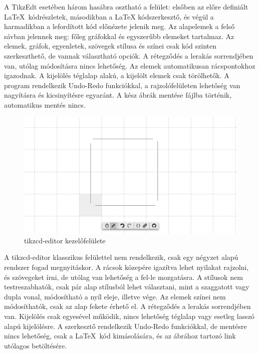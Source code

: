 \noindent
A TikzEdt esetében három hasábra osztható a felület: elsőben az előre definiált \LaTeX\ kódrészletek, másodikban a LaTeX kódszerkesztő, és végül a harmadikban a lefordított kód előnézete jelenik meg. Az alapelemek a felső sávban jelennek meg: főleg gráfokkal és egyszerűbb elemeket tartalmaz. Az elemek, gráfok, egyenletek, szövegek stílusa és színei csak kód szinten szerkeszthető, de vannak választható opciók. A rétegződés a lerakás sorrendjében van, utólag módosításra nincs lehetőség. Az elemek automatikusan rácspontokhoz igazodnak. A kijelölés téglalap alakú, a kijelölt elemek csak törölhetők.  A program rendelkezik Undo-Redo funkciókkal, a rajzolófelületen lehetőség van nagyításra és kicsinyítésre egyaránt. A kész ábrák mentése fájlba történik, automatikus mentés nincs.

\begin{figure}[!h]
	\includegraphics[width=\textwidth]{images/tikzcd.png}
	\caption{tikzcd-editor kezelőfelülete \cite{tikzcd}}
	\label{fig:tikzcd}
\end{figure}

\noindent
A tikzcd-editor klasszikus felülettel nem rendelkezik, csak egy négyzet alapú rendszer fogad megnyitáskor. A rácsok közepére igazítva lehet nyilakat rajzolni, és szövegeket írni, de utólag van lehetőség a fel-le mozgatásra. A stílusok nem testreszabhatók, csak pár alap stílusból lehet választani, mint a szaggatott vagy dupla vonal, módosítható a nyíl eleje, illetve vége. Az elemek színei nem módosíthatók, csak az alap fekete érhető el. A rétegződés a lerakás sorrendjében van. Kijelölés csak egyesével működik, nincs lehetőség téglalap vagy esetleg lasszó alapú kijelölésre. A szerkesztő rendelkezik Undo-Redo funkciókkal, de mentésre nincs lehetőség, csak a \LaTeX\ kód kimásolására, és az ábrához tartozó link utólagos betöltésére.


